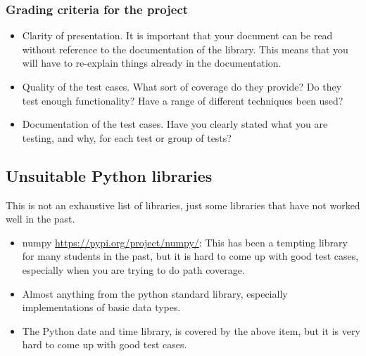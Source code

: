 \documentclass[a4paper]{article}
\begin{document}
\subsubsection*{Grading criteria for the project}
\begin{itemize}
\item Clarity of presentation. It is important that your document can
  be read without reference to the documentation of the library. This
  means that you will have to re-explain things already in the
  documentation. 
\item Quality of the test cases. What sort of coverage do they
  provide? Do they test enough functionality? Have a range of different 
  techniques been used?
\item Documentation of the test cases. Have you clearly stated what you are
  testing, and why, for each test or group of tests? 

 
\end{itemize}

\subsection*{Unsuitable Python libraries}
This is not an exhaustive list of libraries, just some libraries that
have not worked well in the past.
\begin{itemize}
\item numpy \url{https://pypi.org/project/numpy/}: This has been a
  tempting library for many students in the past, but it is hard to
  come up with good test cases, especially when you are trying to do
  path coverage.
\item Almost anything from the python standard library, especially
  implementations of basic data types.
\item The Python date and time library, is covered by the above item,
  but it is very hard to come up with good test cases.
  
\end{itemize}
\end{document}
